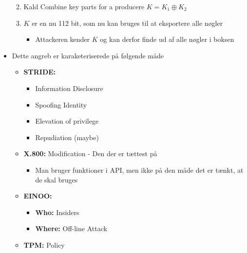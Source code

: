 \documentclass[a4, english]{article}
\begin{document}
\begin{itemize}
\begin{enumerate}
\begin{itemize}
    \end{itemize}
    \item Kald Combine key parts for a producere $K=K_1 \oplus K_2$ 
    \item $K$ er en nu 112 bit, som nu kan bruges til at eksportere alle nøgler 
    \begin{itemize}
    	\item Attackeren kender $K$ og kan derfor finde ud af alle nøgler i boksen 
    \end{itemize}
  \end{enumerate}
  \item Dette angreb er karaketeriserede på følgende måde  
  \begin{itemize}
	  \item \textbf{STRIDE:} 
    \begin{itemize}
  		\item Information Disclosure
  		\item Spoofing Identity
  		\item Elevation of privilege
  		\item Repudiation (maybe)
    \end{itemize}
  	\item \textbf{X.800:} Modification - Den der er tættest på 
    \begin{itemize}
    	\item Man bruger funktioner i API, men ikke på den måde det er tænkt, at de skal bruges
    \end{itemize}
    \item \textbf{EINOO:}
    \begin{itemize}
    	\item \textbf{Who:} Insiders
      \item \textbf{Where:} Off-line Attack 
    \end{itemize}
	  \item \textbf{TPM:} Policy 
  \end{itemize}
\end{itemize}
\end{document}
